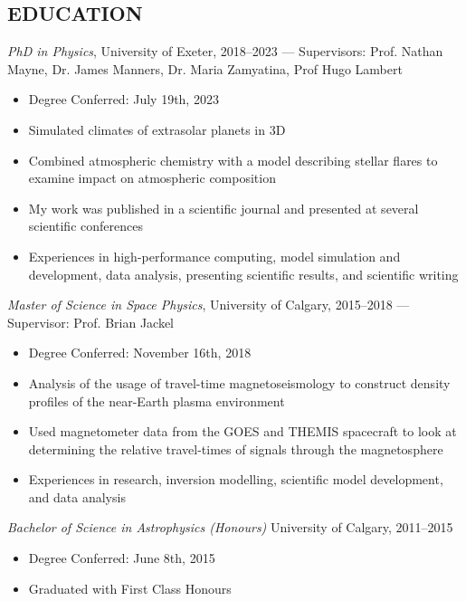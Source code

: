 \documentclass[letter, margin, 10pt]{res} %
\begin{document}
\begin{resume}
\section{EDUCATION}

{\sl PhD in Physics}, University of Exeter, 2018--2023 --- Supervisors: Prof. Nathan Mayne, Dr. James Manners, Dr. Maria Zamyatina, Prof Hugo Lambert
\begin{itemize}[noitemsep,topsep=0pt,parsep=0pt,partopsep=0pt]
\item Degree Conferred: July 19th, 2023
\item Simulated climates of extrasolar planets in 3D 
\item Combined atmospheric chemistry with a model describing stellar flares to examine impact on atmospheric composition
\item My work was published in a scientific journal and presented at several scientific conferences
\item Experiences in high-performance computing, model simulation and development, data analysis, presenting scientific results, and scientific writing
\end{itemize}
\vspace{-10pt}
{\sl Master of Science in Space Physics}, University of Calgary, 2015--2018 --- Supervisor: Prof. Brian Jackel
\begin{itemize}[noitemsep,topsep=0pt,parsep=0pt,partopsep=0pt]
\item Degree Conferred: November 16th, 2018
\item Analysis of the usage of travel-time magnetoseismology to construct density profiles of the near-Earth plasma environment
\item Used magnetometer data from the GOES and THEMIS spacecraft to look at determining the relative travel-times of signals  through the magnetosphere
\item Experiences in research, inversion modelling, scientific model development, and data analysis
\end{itemize}

\vspace{-10pt}
{\sl Bachelor of Science in Astrophysics (Honours)} University of Calgary, 2011--2015
\begin{itemize}[noitemsep,topsep=0pt,parsep=0pt,partopsep=0pt]
\item Degree Conferred: June 8th, 2015
\item Graduated with First Class Honours
\end{itemize}


\end{resume}
\end{document}
